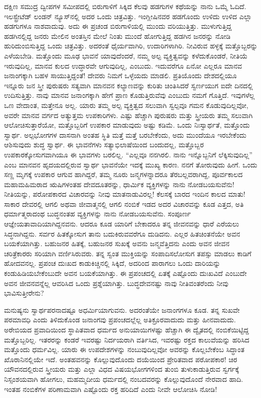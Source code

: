 ದಕ್ಷಿಣ ಸಮುದ್ರ ದ್ವೀಪಗಳ ಸಮೀಪದಲ್ಲಿ ಬಿರುಗಾಳಿಗೆ ಸಿಕ್ಕಿದ ಕೆಲವು ಹಡಗುಗಳ ಕಥೆಯನ್ನು ನಾನು ಒಮ್ಮೆ ಓದಿದೆ. ಇಲಸ್ಟ್ರೇಟೆಡ್​ ಲಂಡನ್​ ನ್ಯೂಸ್​ನಲ್ಲಿ ಅದರ ಒಂದು ಚಿತ್ರವಿತ್ತು. ಇಂಗ್ಲೀಷಿನವರ ಹಡಗೊಂದು ಉಳಿದು ಉಳಿದ ಎಲ್ಲಾ ಹಡಗುಗಳೂ ನಾಶವಾದುವು. ಅದು ಈ ಪ್ರಚಂಡ ಬಿರುಗಾಳಿಯಲ್ಲಿ ಮುಂದು ವರಿಯುತ್ತಿತ್ತು. ಮುಳುಗುತ್ತಿದ್ದ ಹಡಗಿನಲ್ಲಿದ್ದ ಜನರು ಮೇಲಿನ ಅಂತಸ್ತಿನ ಮೇಲೆ ನಿಂತು ಮುಂದೆ ಹೋಗುತ್ತಿದ್ದ ಹಡಗಿನ ಜನರನ್ನು ನೋಡಿ ಹುರಿದುಂಬಿಸುತ್ತಿದ್ದ ಒಂದು ಚಿತ್ರವಿತ್ತು. ಅದರಂತೆ ಧೈರ್ಯವಾಗಿರಿ, ಉದಾರಿಗಳಾಗಿರಿ. ನೀವಿರುವ ಹಳ್ಳಕ್ಕೆ ಮತ್ತೊಬ್ಬರನ್ನು ಎಳೆಯಬೇಡಿ. ಮತ್ತೊಂದು ಮೂಢ ಭಾವನೆ ಯಾವುದೆಂದರೆ, ನಮ್ಮ ಅಲ್ಪ ವ್ಯಕ್ತಿತ್ವವನ್ನು ಕಳೆದುಕೊಂಡರೆ, ನೀತಿಯೆ ಇರುವುದಿಲ್ಲ, ಮಾನವ ಕುಲದ ಉದ್ಧಾರವೇ ಆಗುವುದಿಲ್ಲ, ಎಂಬುದು. ಇದುವರೆಗೂ ಏನೋ ಎಲ್ಲರೂ ಮಾನವ ಜನಾಂಗಕ್ಕಾಗಿ ಬಹಳ ಸಾಯುತ್ತಿದ್ದಂತೆ! ದೇವರು ನಿಮಗೆ ಒಳ್ಳೆಯದು ಮಾಡಲಿ. ಪ್ರತಿಯೊಂದು ದೇಶದಲ್ಲಿಯೂ ಇನ್ನೂರು ಜನ ಸ್ತ್ರೀ ಪುರುಷರು ಸತ್ಯವಾಗಿ ಮಾನವನ ಕಲ್ಯಾಣವನ್ನು ಕುರಿತು ಚಿಂತಿಸಿದರೆ ಸ್ವರ್ಣಯುಗ ಐದೇ ದಿನದಲ್ಲಿ ಉದಿಸುತ್ತಿತ್ತು. ನಾವು ಮಾನವ ಜನಾಂಗಕ್ಕಾಗಿ ಹೇಗೆ ಪ್ರಾಣ ಕೊಡುತ್ತಿರುವೆವು ಎಂಬುದು ನಮಗೆ ಗೊತ್ತಿದೆ. ಇವುಗಳೆಲ್ಲ ಒಣ ವೇದಾಂತ, ಮತ್ತೇನೂ ಅಲ್ಲ. ಯಾರು ತಮ್ಮ ಅಲ್ಪ ವ್ಯಕ್ತಿತ್ವದ ಸಲುವಾಗಿ ಸ್ವಲ್ಪವೂ ಗಮನ ಕೊಡುವುದಿಲ್ಲವೋ, ಅವರೇ ಮಾನವ ವರ್ಗದ ಅತ್ಯುತ್ತಮ ಉಪಕಾರಿಗಳು. ಎಷ್ಟು ಹೆಚ್ಚಾಗಿ ಪುರುಷರು ಮತ್ತು ಸ್ತ್ರೀಯರು ತಮ್ಮ ಸಲುವಾಗಿ ಆಲೋಚಿಸುತ್ತಾರೆಯೋ, ಮತ್ತೊಬ್ಬರಿಗೆ ಉಪಕಾರ ಮಾಡುವುದು ಅಷ್ಟು ಕಡಿಮೆ. ಒಂದು ನಿಃಸ್ವಾರ್ಥತೆ, ಮತ್ತೊಂದು ಸ್ವಾರ್ಥ. ಅಲ್ಪಭೋಗಗಳ ದಾಸನಾಗಿ ಅಂತಹ ಸ್ಥಿತಿ ಮತ್ತೆ ಮತ್ತೆ ಬರಬೇಕೆಂದು, ಅದು ಮುಂದೆಯೂ ಇರಬೇಕೆಂದು ಆಶಿಸುವುದು ಶುದ್ಧ ಸ್ವಾರ್ಥ. ಈ ಭಾವನೆಗಳು ಸತ್ಯಾಭಿಲಾಷೆಯಿಂದ ಬಂದುದಲ್ಲ, ಮತ್ತೊಬ್ಬರ ಉಪಕಾರಕ್ಕೋಸುಗವಾಗಿಯೂ ಈ ಭಾವಗಳು ಬರಲಿಲ್ಲ. “ಎಲ್ಲವೂ ನನಗಿರಲಿ. ನಾನು ಇನ್ನೊಬ್ಬನಿಗೆ ಲೆಕ್ಕಿಸುವುದಿಲ್ಲ” ಎಂಬ ಮಾನವನ ಹೃದಯದಲ್ಲಿರುವ ಸ್ವಾರ್ಥ ಭಾವನೆಯೇ ಇದಕ್ಕೆ ಮುಖ್ಯ ಕಾರಣ. ನನಗೆ ತೋರುವುದು ಹೀಗೆ. ಒಂದು ಸಣ್ಣ ಮೃಗಕ್ಕೆ ಉಪಕಾರ ಆಗುವ ಹಾಗಿದ್ದರೆ, ತಮ್ಮ ನೂರು ಜನ್ಮಗಳನ್ನಾದರೂ ತೆರಬಲ್ಲವರಾಗಿದ್ದ, ಪೂರ್ವಕಾಲದ ಮಹಾಮಹಿಮರಾದ ಋಷಿಗಳಂತಹ ದೇವದೂತರನ್ನು, ಧಾರ್ಮಿಕ ವ್ಯಕ್ತಿಗಳನ್ನು ನಾನು ನೋಡಬಯಸುವೆನು! ನೀತಿಯನ್ನು, ಪರೋಪಕಾರದ ವಿಚಾರವನ್ನು ನೀವು ಮಾತನಾಡುವಿರಲ್ಲ! ಕೆಲಸಕ್ಕೆ ಬಾರದ ಇಂದಿನ ಕಾಲದ ಮಾತು! ಸಾಕಾರ ದೇವರಲ್ಲಿ ಆಗಲಿ ಅಥವಾ ಜೀವಾತ್ಮನಲ್ಲಿ ಆಗಲಿ ನಂಬಿಕೆ ಇಡದ ಅದರ ವಿಚಾರವನ್ನು ಕೂಡ ಎತ್ತದ, ಅತಿ ಧರ್ಮಾತ್ಮರಾದಂಥ ಬುದ್ಧನಂತಹ ವ್ಯಕ್ತಿಗಳನ್ನು ನಾನು ನೋಡಬಯಸುವೆನು. ಸಂಪೂರ್ಣ ಆಜ್ಞೇಯತಾವಾದಿಯಾಗಿದ್ದನವನು. ಆದರೂ ಕೂಡ ಯಾರಿಗೆ ಬೇಕಾದರೂ ತನ್ನ ಜೀವನವನ್ನು ಧಾರೆ ಎರೆಯಲು ಸಿದ್ಧನಾಗಿದ್ದನು. ಸರ್ವರ ಹಿತಕ್ಕೋಸುಗ ತಾನು ಬದುಕಿರುವವರೆಗೂ ದುಡಿದನು. ಎಲ್ಲರ ಹಿತಚಿಂತನೆಯೇ ಅವನ ಬಯಕೆಯಾಗಿತ್ತು. ಬಹುಜನರ ಹಿತಕ್ಕೆ, ಬಹುಜನರ ಸುಖಕ್ಕೆ ಅವನು ಜನ್ಮವೆತ್ತಿದನು ಎಂದು ಅವನ ಜೀವನ ಚರಿತ್ರೆಕಾರರು ಸರಿಯಾಗಿ ವರ್ಣಿಸಿರುವರು. ತನ್ನ ಸ್ವಂತ ಮುಕ್ತಿಯನ್ನು ಸಂಪಾದಿಸಲೋಸುಗ ತಪಸ್ಸು ಮಾಡಲು ಕಾಡಿಗೆ ಹೋದವನಲ್ಲ. ಪ್ರಪಂಚ ದುಃಖದ ಕಾಡುಕಿಚ್ಚಿನಲ್ಲಿ ಸಿಕ್ಕಿದೆ, ಅದರಿಂದ ಪಾರಾಗಲು ಒಂದು ದಾರಿಯನ್ನು ಕಂಡುಹಿಡಿಯಬೇಕೆಂಬುದೇ ಅವನ ಬಯಕೆಯಾಗಿತ್ತು. ಈ ಪ್ರಪಂಚದಲ್ಲಿ ಏತಕ್ಕೆ ಎಷ್ಟೊಂದು ದುಃಖವಿದೆ ಎಂಬುದೇ ಅವನ ಜೀವನವನ್ನೆಲ್ಲ ಆವರಿಸಿದ ಒಂದು ಪ್ರಶ್ನೆಯಾಗಿತ್ತು. ಬುದ್ಧದೇವನಷ್ಟು ನಾವು ನೀತಿವಂತರೆಂದು ನೀವು ಭಾವಿಸುತ್ತೀರೇನು?

\vskip 0.2cm

ಮನುಷ್ಯನು ಸ್ವಾರ್ಥಪರನಾದಷ್ಟೂ ಅಧರ್ಮಿಯಾಗುವನು. ಅದರಂತೆಯೇ ಜನಾಂಗಗಳೂ ಕೂಡ. ತನ್ನ ಸುಖವೇ ಪರಮಾವಧಿ ಎಂದು ತಿಳಿದುಕೊಂಡ ಜನಾಂಗವು ಪ್ರಪಂಚದಲ್ಲೆಲ್ಲ ಅತಿಕ್ರೂರವಾದುದು ಮತ್ತು ಹೀನವಾದುದು. ಅರೇಬಿಯದ ಪ್ರವಾದಿಯಿಂದ ಸ್ಥಾಪಿತವಾದ ಧರ್ಮದ ಅನುಯಾಯಿಗಳಷ್ಟು ಹೆಚ್ಚಾಗಿ ಈ ದ್ವೈತದಲ್ಲಿ ನಂಬಿಕೆಯಿಟ್ಟಿದ್ದ ಮತ್ತೊಬ್ಬರಿಲ್ಲ. ಇತರರನ್ನು ಕಂಡರೆ ಇವರಷ್ಟು ನಿರ್ದಯರಾಗಿ ವರ್ತಿಸಿದ, ಇವರಷ್ಟು ರಕ್ತದ ಕಾಲುವೆಯನ್ನು ಹರಿಸಿದ ಮತ್ತೊಂದು ಧರ್ಮವಿಲ್ಲ. ಯಾರು ಈ ಉಪದೇಶಗಳನ್ನು ನಂಬುವುದಿಲ್ಲವೋ ಅವರನ್ನು ಕೊಲ್ಲಬೇಕೆಂಬ ಸಿದ್ಧಾಂತ ಖೊರಾನಿನಲ್ಲಿಯೇ ಇದೆ. ಅಂತಹವನನ್ನು ಕೊಲ್ಲುವುದೊಂದು ದಯೆಯಿಂದ ಪ್ರೇರಿತವಾದ ಪರೋಪಕಾರ! ಚಿರ ಯೌವನದಲ್ಲಿರುವ ಸ್ತ್ರೀಯರು ಮತ್ತು ಎಲ್ಲಾ ವಿಧದ ವಿಷಯಭೋಗಗಳಿಂದ ತುಂಬಿ ತುಳುಕಾಡುತ್ತಿರುವ ಸ್ವರ್ಗಕ್ಕೆ ನಿಸ್ಸಂಶಯವಾಗಿ ಹೋಗಲು, ಮಹಮ್ಮದೀಯ ಧರ್ಮದಲ್ಲಿ ನಂಬದವರನ್ನು ಕೊಲ್ಲುವುದೊಂದೆ ನೇರವಾದ ಹಾದಿ. ಇಂತಹ ನಂಬಿಕೆಗಳ ಪರಿಣಾಮವಾಗಿ ಎಷ್ಟೊಂದು ರಕ್ತ ಹರಿದಿದೆ ಎಂದು ನೀವೇ ಆಲೋಚಿಸಿ ನೋಡಿ!

